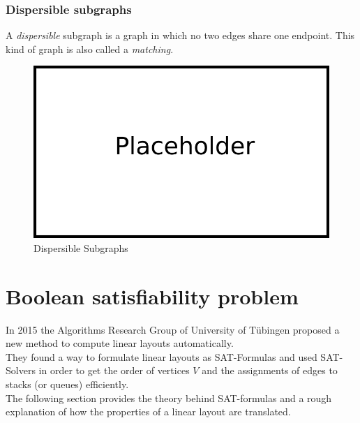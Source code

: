 \subsubsection{Dispersible subgraphs}
A \textit{dispersible} subgraph is a graph in which no two edges share one endpoint. This kind of graph is also called a \textit{matching}.
\begin{figure}[!h]
\begin{center}
\includegraphics[width=1\textwidth]{figures/Platzhalter.png}
\caption{Dispersible Subgraphs}
\label{img:plzhltr}
\end{center}
\end{figure} 
\newpage
\section{Boolean satisfiability problem}
In 2015 the Algorithms Research Group of University of Tübingen proposed a new method to compute linear layouts automatically. \\
They found a way to formulate linear layouts as SAT-Formulas and used SAT-Solvers in order to get the order of vertices $V$ and the assignments of edges to stacks (or queues) efficiently.\\
The following section provides the theory behind SAT-formulas and  a rough explanation of how the properties of a linear layout are translated.
